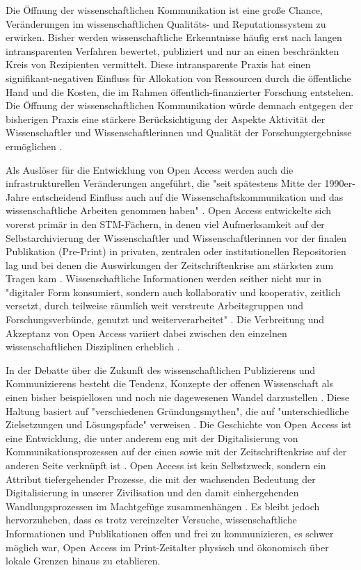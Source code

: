 Die Öffnung der wissenschaftlichen Kommunikation ist eine große Chance, Veränderungen im wissenschaftlichen Qualitäts- und Reputationssystem zu erwirken. Bisher werden wissenschaftliche Erkenntnisse häufig erst nach langen intransparenten Verfahren bewertet, publiziert und nur an einen beschränkten Kreis von Rezipienten vermittelt. Diese intransparente Praxis hat einen signifikant-negativen Einfluss für Allokation von Ressourcen durch die öffentliche Hand und die Kosten, die im Rahmen öffentlich-finanzierter Forschung entstehen. Die Öffnung der wissenschaftlichen Kommunikation würde demnach entgegen der bisherigen Praxis eine stärkere Berücksichtigung der Aspekte Aktivität der Wissenschaftler und Wissenschaftlerinnen und Qualität der Forschungsergebnisse ermöglichen \cite{Heise_2012b}.

Als Auslöser für die Entwicklung von Open Access werden auch die infrastrukturellen Veränderungen angeführt, die "seit spätestens Mitte der 1990er-Jahre entscheidend Einfluss auch auf die Wissenschaftskommunikation und das wissenschaftliche Arbeiten genommen haben" \cite{Schulze_2013}. Open Access entwickelte sich vorerst primär in den STM-Fächern, in denen viel Aufmerksamkeit auf der Selbstarchivierung der Wissenschaftler und Wissenschaftlerinnen vor der finalen Publikation (Pre-Print) in privaten, zentralen oder institutionellen Repositorien lag \cite{Adema_2013} und bei denen die Auswirkungen der Zeitschriftenkrise am stärksten zum Tragen kam \cite{Naeder_2010}. Wissenschaftliche Informationen werden seither nicht nur in "digitaler Form konsumiert, sondern auch kollaborativ und kooperativ, zeitlich versetzt, durch teilweise räumlich weit verstreute Arbeitsgruppen und Forschungsverbünde, genutzt und weiterverarbeitet" \cite{Schulze_2013}. Die Verbreitung und Akzeptanz von Open Access variiert dabei zwischen den einzelnen wissenschaftlichen Disziplinen erheblich \cite{Bernius_2009}.

In der Debatte über die Zukunft des wissenschaftlichen Publizierens und Kommunizierens besteht die Tendenz, Konzepte der offenen Wissenschaft als einen bisher beispiellosen und noch nie dagewesenen Wandel darzustellen \cite{Naeder_2010} \cite{Bjoerk_2010}. Diese Haltung basiert auf "verschiedenen Gründungsmythen", die auf "unterschiedliche Zielsetzungen und Lösungspfade" verweisen \cite[:7]{Hofmann_2015}. Die Geschichte von Open Access ist eine Entwicklung, die unter anderem eng mit der Digitalisierung von Kommunikationsprozessen auf der einen sowie mit der Zeitschriftenkrise auf der anderen Seite verknüpft ist \cite[:6]{Hofmann_2015} \cite{Yiotis_2013} \cite[:286]{Wein_2010}. Open Access ist kein Selbstzweck, sondern ein Attribut tiefergehender Prozesse, die mit der wachsenden Bedeutung der Digitalisierung in unserer Zivilisation und den damit einhergehenden Wandlungsprozessen im Machtgefüge zusammenhängen \cite{Hoffmann_2014}. Es bleibt jedoch hervorzuheben, dass es trotz vereinzelter Versuche, wissenschaftliche Informationen und Publikationen offen und frei zu kommunizieren, es schwer möglich war, Open Access im Print-Zeitalter physisch und ökonomisch über lokale Grenzen hinaus zu etablieren.

